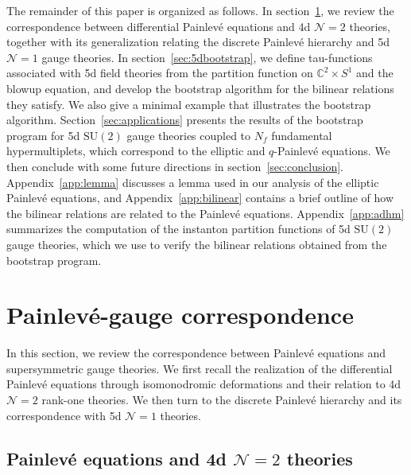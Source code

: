 \documentclass[11pt, a4paper]{article}
\theoremstyle{definition}
\begin{document}
The remainder of this paper is organized as follows. In section~\ref{sec:Painleve-gauge}, we review the correspondence between differential Painlev\'e equations and 4d $ \mathcal{N}=2 $ theories, together with its generalization relating the discrete Painlev\'e hierarchy and 5d $ \mathcal{N}=1 $ gauge theories. In section~\ref{sec:5dbootstrap}, we define tau-functions associated with 5d field theories from the partition function on $ \mathbb{C}^2 \times S^1 $ and the blowup equation, and develop the bootstrap algorithm for the bilinear relations they satisfy. We also give a minimal example that illustrates the bootstrap algorithm. Section~\ref{sec:applications} presents the results of the bootstrap program for 5d $ \mathrm{SU}(2) $ gauge theories coupled to $ N_f $ fundamental hypermultiplets, which correspond to the elliptic and $ q $-Painlev\'e equations. We then conclude with some future directions in section~\ref{sec:conclusion}. Appendix~\ref{app:lemma} discusses a lemma used in our analysis of the elliptic Painlev\'e equations, and Appendix~\ref{app:bilinear} contains a brief outline of how the bilinear relations are related to the Painlev\'e equations. Appendix~\ref{app:adhm} summarizes the computation of the instanton partition functions of 5d $ \mathrm{SU}(2) $ gauge theories, which we use to verify the bilinear relations obtained from the bootstrap program.


\section{Painlev\'e-gauge correspondence} \label{sec:Painleve-gauge}

In this section, we review the correspondence between Painlev\'e equations and supersymmetric gauge theories. We first recall the realization of the differential Painlev\'e equations through isomonodromic deformations and their relation to 4d $ \mathcal{N}=2 $ rank-one theories. We then turn to the discrete Painlev\'e hierarchy and its correspondence with 5d $ \mathcal{N}=1 $ theories.


\subsection{Painlev\'e equations and 4d \texorpdfstring{$ \mathcal{N}=2 $}{N=2} theories}
\end{document}
